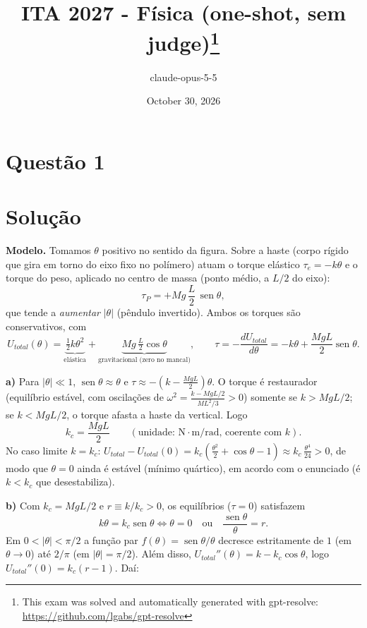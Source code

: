 \documentclass{article}%
\title{ITA 2027 - Física (one-shot, sem judge)\thanks{This exam was solved and automatically generated with gpt-resolve: \url{https://github.com/lgabs/gpt-resolve}}}%
\author{claude{-}opus{-}5{-}5}%
\date{October 30, 2026}%
\begin{document}
%
\normalsize%
\maketitle%
\section*{Questão 1}

\section*{Solução}

\textbf{Modelo.} Tomamos $\theta$ positivo no sentido da figura. Sobre a haste (corpo rígido que gira em torno do eixo fixo no polímero) atuam o torque elástico $\tau_e=-k\theta$ e o torque do peso, aplicado no centro de massa (ponto médio, a $L/2$ do eixo):
\[
\tau_P=+Mg\,\frac{L}{2}\,\operatorname{sen}\theta ,
\]
que tende a \emph{aumentar} $|\theta|$ (pêndulo invertido). Ambos os torques são conservativos, com
\[
U_{total}(\theta)=\underbrace{\tfrac12 k\theta^2}_{\text{elástica}}+\underbrace{Mg\,\tfrac{L}{2}\cos\theta}_{\text{gravitacional (zero no mancal)}},
\qquad
\tau=-\frac{dU_{total}}{d\theta}=-k\theta+\frac{MgL}{2}\operatorname{sen}\theta .
\]

\textbf{a)} Para $|\theta|\ll 1$, $\operatorname{sen}\theta\approx\theta$ e
$\tau\approx-\left(k-\tfrac{MgL}{2}\right)\theta$. O torque é restaurador (equilíbrio estável, com oscilações de $\omega^2=\frac{k-MgL/2}{ML^2/3}>0$) somente se $k>MgL/2$; se $k<MgL/2$, o torque afasta a haste da vertical. Logo
\[
\boxed{k_c=\frac{MgL}{2}}\qquad(\text{unidade: N}\cdot\text{m/rad, coerente com }k).
\]
No caso limite $k=k_c$: $U_{total}-U_{total}(0)=k_c\left(\tfrac{\theta^2}{2}+\cos\theta-1\right)\approx k_c\,\tfrac{\theta^4}{24}>0$, de modo que $\theta=0$ ainda é estável (mínimo quártico), em acordo com o enunciado (é $k<k_c$ que desestabiliza).

\textbf{b)} Com $k_c=MgL/2$ e $r\equiv k/k_c>0$, os equilíbrios ($\tau=0$) satisfazem
\[
k\theta=k_c\operatorname{sen}\theta\iff \theta=0\quad\text{ou}\quad \frac{\operatorname{sen}\theta}{\theta}=r .
\]
Em $0<|\theta|<\pi/2$ a função par $f(\theta)=\operatorname{sen}\theta/\theta$ decresce estritamente de $1$ (em $\theta\to0$) até $2/\pi$ (em $|\theta|=\pi/2$). Além disso, $U_{total}''(\theta)=k-k_c\cos\theta$, logo $U_{total}''(0)=k_c(r-1)$. Daí:
\end{document}
